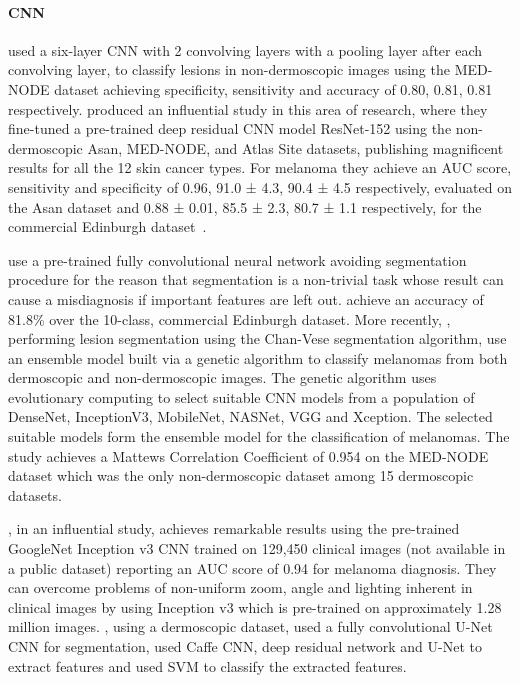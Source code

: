 \documentclass[12pt, a4paper]{article}
\begin{document}
\paragraph{CNN}
\cite{7590963} used a six-layer CNN with 2 convolving layers with a pooling layer after each convolving layer, to classify lesions in non-dermoscopic images using the MED-NODE dataset achieving specificity, sensitivity and accuracy of 0.80, 0.81, 0.81 respectively. \cite{HAN20181529} produced an influential study in this area of research, where they fine-tuned a pre-trained deep residual CNN model ResNet-152 \citep{he2016deep} using the non-dermoscopic Asan, MED-NODE, and Atlas Site datasets, publishing magnificent results for all the 12 skin cancer types. For melanoma they achieve an AUC score, sensitivity and specificity of 0.96, 91.0 ± 4.3, 90.4 ± 4.5 respectively, evaluated on the Asan dataset and 0.88 ± 0.01, 85.5 ± 2.3, 80.7 ± 1.1 respectively, for the commercial Edinburgh dataset~\citep{di2015hierarchical}.

\cite{7493528} use a pre-trained fully convolutional neural network avoiding segmentation procedure for the reason that segmentation is a non-trivial task whose result can cause a misdiagnosis if important features are left out. \cite{7493528} achieve an accuracy of 81.8\% over the 10-class, commercial Edinburgh dataset. More recently, \cite{perez2021ensemble}, performing lesion segmentation using the Chan-Vese segmentation algorithm, use an ensemble model built via a genetic algorithm to classify melanomas from both dermoscopic and non-dermoscopic images. The genetic algorithm uses evolutionary computing to select suitable CNN models from a population of DenseNet, InceptionV3, MobileNet, NASNet, VGG and Xception. The selected suitable models form the ensemble model for the classification of melanomas. The study achieves a Mattews Correlation Coefficient of 0.954 on the MED-NODE dataset which was the only non-dermoscopic dataset among 15 dermoscopic datasets.

\cite{esteva2017dermatologist}, in an influential study, achieves remarkable results using the pre-trained GoogleNet Inception v3 CNN trained on 129,450 clinical images (not available in a public dataset) reporting an AUC score of 0.94 for melanoma diagnosis. They can overcome problems of non-uniform zoom, angle and lighting inherent in clinical images by using Inception v3 which is pre-trained on approximately 1.28 million images. \cite{codella2017deep}, using a dermoscopic dataset, used a fully convolutional U-Net CNN for segmentation, used Caffe CNN, deep residual network and U-Net to extract features and used SVM to classify the extracted features.
\end{document}

